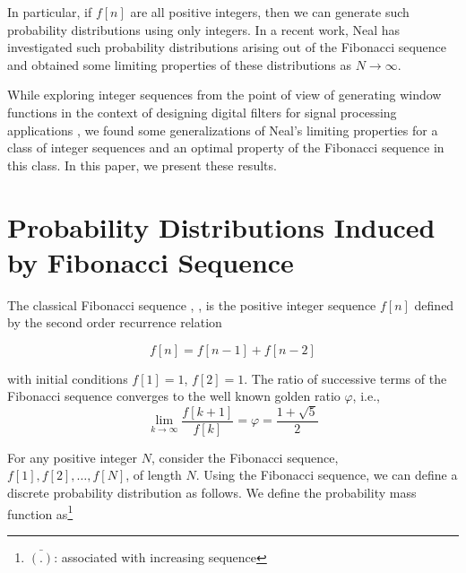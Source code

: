 \begin{multicols}{2}
\vspace{-.2cm}

In particular, if $f[n]$ are all positive integers, then we can generate such probability distributions using only integers. In a recent work, Neal \cite{art1-key01} has investigated such probability distributions arising out of the Fibonacci sequence and obtained some limiting properties of these distributions as $N \rightarrow \infty$.

While exploring integer sequences from the point of view of generating window functions in the context of designing digital filters for signal processing applications \cite{art1-key02}, we found some generalizations of Neal's limiting properties for a class of integer sequences and an optimal property of the Fibonacci sequence in this class. In this paper, we present these results.

\section{Probability Distributions Induced by Fibonacci Sequence}\label{section-2}

The classical Fibonacci sequence \cite{art1-key03}, \cite{art1-key04}, is the positive integer sequence $f[n]$ defined by the second order recurrence relation


\vspace{-.4cm}

  \begin{equation}
  f[n] = f[n-1] + f[n-2]\label{eq-2.1}
    \end{equation}
\vspace{-.2cm}

with initial conditions $f[1] = 1$, $f[2] = 1$.
The ratio of successive terms of the Fibonacci sequence converges to the well known golden ratio $\varphi$, i.e.,
\begin{equation}
\lim_{k \rightarrow \infty} \frac{f[k+1]}{f[k]} = \varphi = \displaystyle{\frac{1 + \sqrt5}{2}}\label{eq-2.2}
\end{equation}

\vspace{-.2cm}

For any positive integer $N$, consider the Fibonacci sequence, $f[1], f[2], \ldots, f[N]$, of length $N$. Using the Fibonacci sequence, we can define a discrete probability distribution as follows. We define the probability mass function as\footnote{${\bar{(.)}}$: associated with increasing sequence}


\end{multicols}
